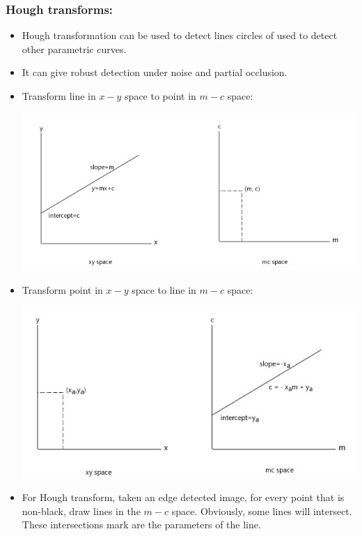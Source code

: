 \subsubsection{Hough transforms:}
\begin{itemize}
\item Hough transformation can be used to detect lines circles of used to detect other parametric curves.
\item It can give robust detection under noise and partial occlusion.
\item Transform line in $x-y$ space to point in $m-c$ space:
\begin{center}
\includegraphics[scale=0.4]{xy-mc.png}
\end{center}
\item Transform point in $x-y$ space to line in $m-c$ space:
\begin{center}
\includegraphics[scale=0.4]{xy-mc-point.png}
\end{center}
\item For Hough transform, taken an edge detected image, for every point that is non-black, draw lines in the $m-c$ space. Obviously, some lines will intersect. These intersections mark are the parameters of the line.

\end{itemize}
